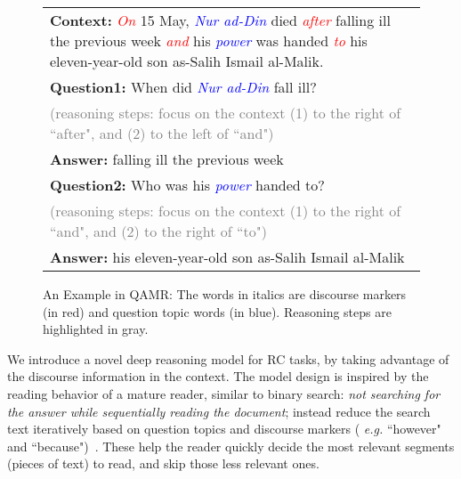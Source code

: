


\begin{figure}[t]
	{\fontsize{9}{10}\selectfont
    \setlength{\tabcolsep}{0.6mm}
    \begin{tabular}{|p{83mm}|}
    \hline
\textbf{Context: }\textit{\textcolor{red}{On}} 15 May, \textit{\textcolor{blue}{Nur ad-Din}} died \textit{\textcolor{red}{after}} falling ill the previous week \textit{\textcolor{red}{and}} his \textit{\textcolor{blue}{power}} was handed \textit{\textcolor{red}{to}} his eleven-year-old son as-Salih Ismail al-Malik. \\
\textbf{Question1: }When did \textit{\textcolor{blue}{Nur ad-Din}} fall ill?     \\
\textcolor{gray}{(reasoning steps: focus on the context (1) to the right of ``after", and (2) to the left of ``and")}\\
\textbf{Answer: }falling ill the previous week \\
\textbf{Question2: }Who was his \textit{\textcolor{blue}{power}} handed to?     \\
\textcolor{gray}{(reasoning steps: focus on the context (1) to the right of ``and", and (2) to the right of ``to")}\\
\textbf{Answer: }his eleven-year-old son as-Salih Ismail al-Malik \\
\hline
    \end{tabular}
    }
\caption{An Example in QAMR: The words in italics are discourse markers (in red) and question topic words (in blue). Reasoning steps are highlighted in gray. }
\label{fig:qa_example}
\vspace{-3ex}
\end{figure}
We introduce a novel deep reasoning model for RC tasks, by taking advantage of the discourse information in the context. The model design is inspired by the reading behavior of a mature reader, similar to binary search: \emph{not searching for the answer while sequentially reading the document}; instead reduce the search text iteratively based on question topics and discourse markers ( \emph{e.g.} ``however" and ``because")~\cite{assiri2011test,sungatullina2016metacognitive}.  These help the reader quickly decide the most relevant segments (pieces of text) to read, and skip those less relevant ones. 

